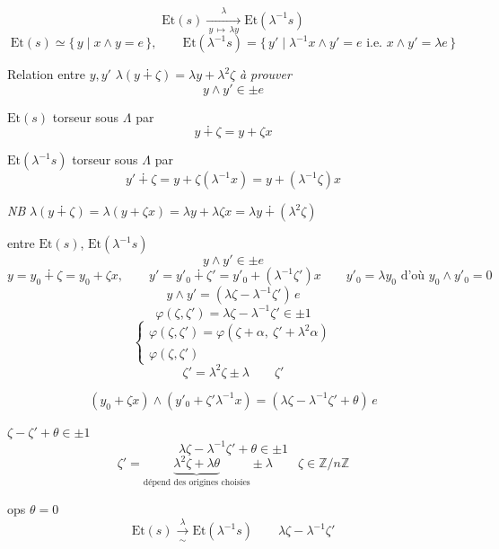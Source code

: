 \documentclass[11pt,a4paper]{article}
\begin{document}
\[
  \mathrm{Et}(s) \xrightarrow[\ y\,\mapsto\,\lambda y\ ]{\ \lambda\ } \mathrm{Et}(\lambda^{-1}s)
\]
\[
  \mathrm{Et}(s) \simeq \{\,y \mid x\wedge y = e\,\}, \qquad
  \mathrm{Et}(\lambda^{-1}s) = \{\,y' \mid \lambda^{-1}x\wedge y' = e \text{ i.e. } x\wedge y' = \lambda e\,\}
\]

Relation entre $y,y'$ \qquad $\boxed{\lambda(y\dotplus\zeta) = \lambda y + \lambda^{2}\zeta}$ \emph{à prouver}
\[
  y\wedge y'\in\pm e
\]

$\mathrm{Et}(s)$ torseur sous $\Lambda$ par
\[
  y\dotplus\zeta = y + \zeta x
\]

$\mathrm{Et}(\lambda^{-1}s)$ torseur sous $\Lambda$ par
\[
  y'\dotplus\zeta = y + \zeta(\lambda^{-1}x) = y + (\lambda^{-1}\zeta)x
\]

\emph{NB} $\lambda(y\dotplus\zeta) = \lambda(y+\zeta x) = \lambda y + \lambda\zeta x = \lambda y \dotplus (\lambda^{2}\zeta)$

 entre $\mathrm{Et}(s)$, $\mathrm{Et}(\lambda^{-1}s)$
\[
  y\wedge y'\in\pm e
\]
\[
  y = y_0\dotplus\zeta = y_0 + \zeta x, \qquad
  y' = y'_0\dotplus\zeta' = y'_0 + (\lambda^{-1}\zeta')x
  \qquad y'_0 = \lambda y_0 \text{ d'où } y_0\wedge y'_0 = 0
\]
\[
  y\wedge y' = (\lambda\zeta - \lambda^{-1}\zeta')\,e
\]
\[
  \varphi(\zeta,\zeta') = \lambda\zeta - \lambda^{-1}\zeta' \in \pm1
\]
\[
  \begin{cases}
    \varphi(\zeta,\zeta') = \varphi(\zeta+\alpha,\ \zeta'+\lambda^{2}\alpha) \\
    \varphi(\zeta,\zeta')
  \end{cases}
\]
\[
  \boxed{\zeta' = \lambda^{2}\zeta \pm \lambda} \qquad \zeta'
\]

\[
  (y_0 + \zeta x)\wedge(y'_0 + \zeta'\lambda^{-1}x)
  = (\lambda\zeta - \lambda^{-1}\zeta' + \theta)\,e
\]

\struck{\ill{}} $\zeta - \zeta' + \theta \in \pm1$
\[
  \boxed{\lambda\zeta - \lambda^{-1}\zeta' + \theta \in \pm1}
\]
\[
  \zeta' = \underbrace{\lambda^{2}\zeta + \lambda\theta}_{\text{dépend des origines choisies}} \pm \lambda
  \qquad \zeta\in\mathbb{Z}/n\mathbb{Z}
\]

ops $\theta = 0$
\[
  \boxed{\mathrm{Et}(s) \xrightarrow[\ \sim\ ]{\ \lambda\ } \mathrm{Et}(\lambda^{-1}s)}
  \qquad \lambda\zeta - \lambda^{-1}\zeta'
\]
\end{document}
